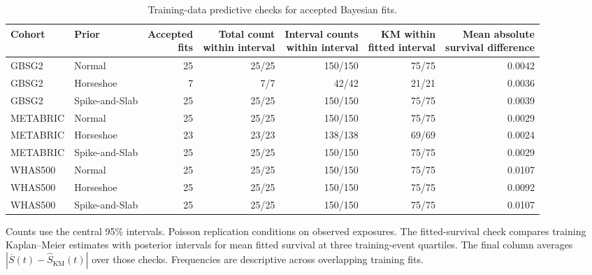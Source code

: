 \begin{table}[htbp]
\centering\footnotesize
\setlength{\tabcolsep}{4pt}
\caption{Training-data predictive checks for accepted Bayesian fits.}
\label{tab:sup-predictive-checks}
\begin{tabular}{@{}llrrrrr@{}}\toprule
Cohort & Prior & \shortstack{Accepted\\fits} & \shortstack{Total count\\within interval} & \shortstack{Interval counts\\within interval} & \shortstack{KM within\\fitted interval} & \shortstack{Mean absolute\\survival difference}\\\midrule
GBSG2 & Normal & 25 & 25/25 & 150/150 & 75/75 & 0.0042 \\
GBSG2 & Horseshoe & 7 & 7/7 & 42/42 & 21/21 & 0.0036 \\
GBSG2 & Spike-and-Slab & 25 & 25/25 & 150/150 & 75/75 & 0.0039 \\
METABRIC & Normal & 25 & 25/25 & 150/150 & 75/75 & 0.0029 \\
METABRIC & Horseshoe & 23 & 23/23 & 138/138 & 69/69 & 0.0024 \\
METABRIC & Spike-and-Slab & 25 & 25/25 & 150/150 & 75/75 & 0.0029 \\
WHAS500 & Normal & 25 & 25/25 & 150/150 & 75/75 & 0.0107 \\
WHAS500 & Horseshoe & 25 & 25/25 & 150/150 & 75/75 & 0.0092 \\
WHAS500 & Spike-and-Slab & 25 & 25/25 & 150/150 & 75/75 & 0.0107 \\
\bottomrule\end{tabular}
\par\smallskip\begin{minipage}{\linewidth}\footnotesize Counts use the central 95\% intervals. Poisson replication conditions on observed exposures. The fitted-survival check compares training Kaplan--Meier estimates with posterior intervals for mean fitted survival at three training-event quartiles. The final column averages $|\overline S(t)-\widehat S_{\mathrm{KM}}(t)|$ over those checks. Frequencies are descriptive across overlapping training fits.\end{minipage}
\end{table}

